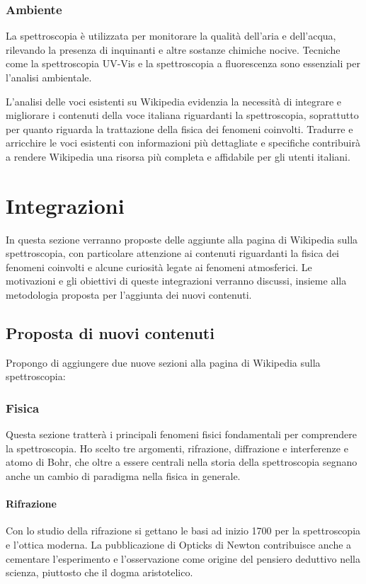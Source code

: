 \documentclass[12pt,a4paper]{report}
\begin{document}
\subsubsection{Ambiente}

La spettroscopia è utilizzata per monitorare la qualità dell'aria e dell'acqua, rilevando la presenza di inquinanti e altre sostanze chimiche nocive. Tecniche come la spettroscopia UV-Vis e la spettroscopia a fluorescenza sono essenziali per l'analisi ambientale.


L'analisi delle voci esistenti su Wikipedia evidenzia la necessità di integrare e migliorare i contenuti della voce italiana riguardanti la spettroscopia, soprattutto per quanto riguarda la trattazione della fisica dei fenomeni coinvolti. Tradurre e arricchire le voci esistenti con informazioni più dettagliate e specifiche contribuirà a rendere Wikipedia una risorsa più completa e affidabile per gli utenti italiani.

\section{Integrazioni}

In questa sezione verranno proposte delle aggiunte alla pagina di Wikipedia sulla spettroscopia, con particolare attenzione ai contenuti riguardanti la fisica dei fenomeni coinvolti e alcune curiosità legate ai fenomeni atmosferici. Le motivazioni e gli obiettivi di queste integrazioni verranno discussi, insieme alla metodologia proposta per l'aggiunta dei nuovi contenuti.

\subsection{Proposta di nuovi contenuti}

Propongo di aggiungere due nuove sezioni alla pagina di Wikipedia sulla spettroscopia:

\subsubsection{Fisica}

Questa sezione tratterà i principali fenomeni fisici fondamentali per comprendere la spettroscopia. Ho scelto tre argomenti, rifrazione, diffrazione e interferenze e atomo di Bohr, che oltre a essere centrali nella storia della spettroscopia segnano anche un cambio di paradigma nella fisica in generale.

\paragraph{Rifrazione} Con lo studio della rifrazione si gettano le basi ad inizio 1700 per la spettroscopia e l'ottica moderna. La pubblicazione di Opticks di Newton contribuisce anche a cementare l'esperimento e l'osservazione come origine del pensiero deduttivo nella scienza, piuttosto che il dogma aristotelico.
\end{document}
